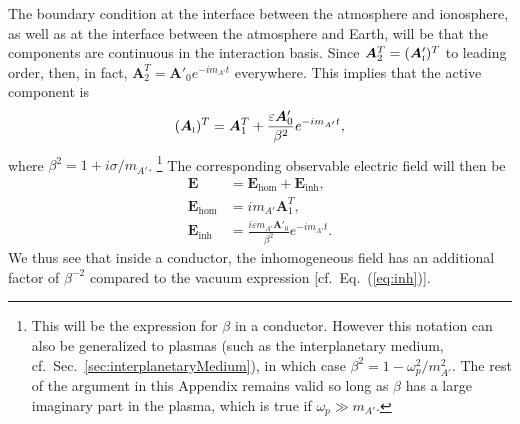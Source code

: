 \documentclass[amsmath,amssymb,aps,10pt,prd,letterpaper,nofootinbib,balancelastpage,notitlepage,superscriptaddress,twocolumn,floatfix]{revtex4-2}
\newcommand{\secref}[2][]{Sec{#1}.~\ref{#2}}		%
\renewcommand{\eqref}[2][]{Eq{#1}.~(\ref{eq:#2})}	%
\newcommand{\inter}[1]{({#1}_{\textsc{i}})}
\newcommand{\primeinter}[1]{({#1}_{\textsc{i}}^\prime)}
\begin{document}
The boundary condition at the interface between the atmosphere and ionosphere, as well as at the interface between the atmosphere and Earth, will be that the components are continuous in the interaction basis.
Since $\bm{A}_2^T=\primeinter{\bm{A}}^T$ to leading order, then, in fact, $\bm{A}_2^T=\bm{A}'_0e^{-im_{A'}t}$ everywhere.
This implies that the active component is
\begin{align}
    \inter{\bm{A}}^T=\bm{A}_1^T+\frac{\varepsilon\bm{A}'_0}{\beta^2}e^{-im_{A'}t},
\end{align}
where $\beta^2=1+i\sigma/m_{A'}$.%
\footnote{\label{ftnt:plasmabeta}%
    This will be the expression for $\beta$ in a conductor.
    However this notation can also be generalized to plasmas (such as the interplanetary medium, cf.~\secref{sec:interplanetaryMedium}), in which case $\beta^2=1-\omega_p^2/m_{A'}^2$.
    The rest of the argument in this Appendix remains valid so long as $\beta$ has a large imaginary part in the plasma, which is true if $\omega_p\gg m_{A'}$.
} %
The corresponding observable electric field will then be
\begin{align}
    \bm{E}&=\bm{E}_\text{hom}+\bm{E}_\text{inh},\\
    \bm{E}_\text{hom}&=im_{A'}\bm{A}_1^T,\\
    \bm{E}_\text{inh}&=\frac{i\varepsilon m_{A'}\bm{A}'_0}{\beta^2}e^{-im_{A'}t}\label{eq:finite_inhom}.
\end{align}
We thus see that inside a conductor, the inhomogeneous field has an additional factor of $\beta^{-2}$ compared to the vacuum expression [cf.~\eqref{inh}].
\end{document}
